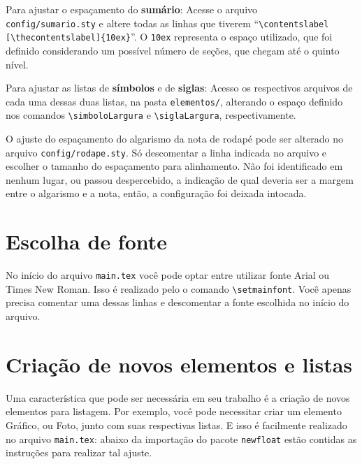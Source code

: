 Para ajustar o espaçamento do \textbf{sumário}: Acesse o arquivo \\\texttt{config/sumario.sty} e altere todas as linhas que tiverem ``\verb|\contentslabel|\\\verb|[\thecontentslabel]{10ex}|''. O \texttt{10ex} representa o espaço utilizado, que foi definido considerando um possível número de seções, que chegam até o quinto nível.

Para ajustar as listas de \textbf{símbolos} e de \textbf{siglas}: Acesso os respectivos arquivos de cada uma dessas duas listas, na pasta \texttt{elementos/}, alterando o espaço definido nos comandos \verb|\simboloLargura| e \verb|\siglaLargura|, respectivamente.

O ajuste do espaçamento do algarismo da nota de rodapé pode ser alterado no arquivo \texttt{config/rodape.sty}. Só descomentar a linha indicada no arquivo e escolher o tamanho do espaçamento para alinhamento. Não foi identificado em nenhum lugar, ou passou despercebido, a indicação de qual deveria ser a margem entre o algarismo e a nota, então, a configuração foi deixada intocada.

\section{Escolha de fonte}
No início do arquivo \texttt{main.tex} você pode optar entre utilizar fonte Arial ou Times New Roman. Isso é realizado pelo o comando \verb|\setmainfont|. Você apenas precisa comentar uma dessas linhas e descomentar a fonte escolhida no início do arquivo.

\section{Criação de novos elementos e listas}
Uma característica que pode ser necessária em seu trabalho é a criação de novos elementos para listagem. Por exemplo, você pode necessitar criar um elemento Gráfico, ou Foto, junto com suas respectivas listas. E isso é facilmente realizado no arquivo \texttt{main.tex}: abaixo da importação do pacote \texttt{newfloat} estão contidas as instruções para realizar tal ajuste.

